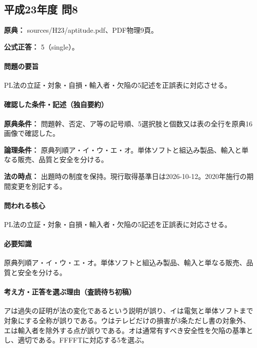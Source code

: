 \subsection{平成23年度 問8}
\label{q:h23-reg-apt-08}

\noindent\textbf{原典：} sources/H23/aptitude.pdf、PDF物理9頁。

\textbf{公式正答：} 5（single）。

\paragraph{問題の要旨} PL法の立証・対象・自損・輸入者・欠陥の5記述を正誤表に対応させる。

\paragraph{確認した条件・記述（独自要約）}\mbox{}\par

\noindent\textbf{原典条件：} 問題幹、否定、ア等の記号順、5選択肢と個数又は表の全行を原典16画像で確認した。\par

\noindent\textbf{論理条件：} 原典列順ア・イ・ウ・エ・オ。単体ソフトと組込み製品、輸入と単なる販売、品質と安全を分ける。\par

\noindent\textbf{法の時点：} 出題時の制度を保持。現行取得基準日は2026-10-12。2020年施行の期間変更を別記する。\par

\paragraph{問われる核心} PL法の立証・対象・自損・輸入者・欠陥の5記述を正誤表に対応させる。

\paragraph{必要知識} 原典列順ア・イ・ウ・エ・オ。単体ソフトと組込み製品、輸入と単なる販売、品質と安全を分ける。

\paragraph{考え方・正答を選ぶ理由（査読待ち初稿）} アは過失の証明が法の変化であるという説明が誤り、イは電気と単体ソフトまで対象にする全称が誤りである。ウはテレビだけの損害が3条ただし書の対象外、エは輸入者を除外する点が誤りである。オは通常有すべき安全性を欠陥の基準とし、適切である。FFFFTに対応する5を選ぶ。

